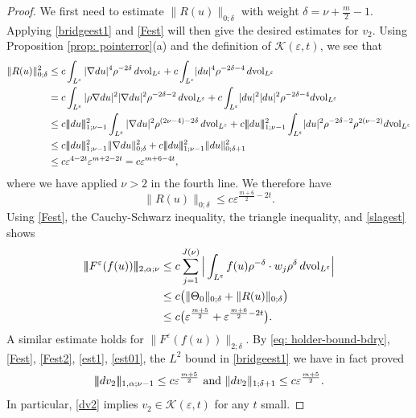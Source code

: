 \documentclass[11pt]{amsart}
\DeclarePairedDelimiter{\tnorm}{\vert\!\vert\!\vert}{\vert\!\vert\!\vert}
\theoremstyle{definition}
\theoremstyle{remark}
\newcommand{\vol}{\mathrm{vol}}
\begin{document}
\begin{proof}
    We first need to estimate $\|R(u)\|_{0;\delta}$ with weight $\delta = \nu + \frac{m}{2}-1$. Applying \eqref{bridgeest1} and \eqref{Fest} will then give the desired estimates for $v_2$. Using Proposition \ref{prop: pointerror}(a) and the definition of $\mathscr{K}(\varepsilon,t)$, we see that 
    \begin{align*}
        \|R(u)\|_{0;\delta}^2 &\leq c\int_{L^\varepsilon} |\nabla du|^4 \rho^{-2\delta} \, d\vol_{L^\varepsilon} +c\int_{L^\varepsilon}\lvert du\rvert^4\rho^{-2\delta-4 }\,d\vol_{L^\varepsilon}\\
        &= c\int_{L^\varepsilon} |\rho \nabla  du|^2 |\nabla  du|^2 \rho^{-2\delta - 2} \, d\vol_{L^\varepsilon} +c\int_{L^\varepsilon}\lvert du\rvert^2\lvert du\rvert^2\rho^{-2\delta-4}d\vol_{L^\varepsilon}\\
        &\leq c\tnorm{du}_{1;\nu-1}^2 \int_{L^\varepsilon} |\nabla  du|^2 \rho^{(2\nu - 4) - 2\delta} \, d\vol_{L^\varepsilon} +c\tnorm{du}_{1;\nu-1}^2\int_{L^\varepsilon}\lvert du\rvert^2\rho^{-2\delta-2}\rho^{2(\nu-2)}d\vol_{L^\varepsilon}\\
        &\leq c\tnorm{du}_{1;\nu-1}^2 \|\nabla du\|_{0;\delta}^2 +c\tnorm{du}_{1;\nu-1}^2 \| du\|_{0;\delta+1}^2\\
        &\leq c \varepsilon^{4  - 2t} \varepsilon^{m + 2 - 2t} = c \varepsilon^{m+6 - 4t},
    \end{align*}
    where we have applied $\nu > 2$ in the fourth line. We therefore have 
    \begin{equation}
        \|R(u)\|_{0;\delta} \leq c \varepsilon^{\frac{m+6}{2}- 2t}.\label{est1}   
    \end{equation}
    Using \eqref{Fest}, the Cauchy-Schwarz inequality, the triangle inequality, and \eqref{slagest} shows
    \begin{align}
        \tnorm{F^\varepsilon(f(u))}_{2, \alpha; \nu} &\leq c\sum_{j = 1}^{J(\nu)}\Big|\int_{L^\varepsilon} f(u)\rho^{-\delta} \cdot w_j \rho^{\delta} \, d\vol_{L^\varepsilon} \Big| \nonumber \\
        &\leq  c\big(\|\Theta_0\|_{0; \delta} + \|R(u)\|_{0;\delta}\big) \nonumber\\
        &\leq c\big(\varepsilon^{\frac{m+5}{2} } + \varepsilon^{\frac{m+6}{2}  - 2t} \big). \label{est01}
    \end{align}
    A similar estimate holds for $\|F^{\varepsilon}(f(u))\|_{2;\delta }$.
    By \ref{eq: holder-bound-bdry}, \eqref{Fest}, \eqref{Fest2}, \eqref{est1}, \eqref{est01},  the $L^2$ bound in \eqref{bridgeest1} we have in fact proved
    \begin{equation}
        \tnorm{dv_2}_{1, \alpha; \nu-1} \leq c \varepsilon^{\frac{m+5}{2}  } \text{ and } \lVert dv_2\rVert_{1; \delta+1} \leq c \varepsilon^{\frac{m+5}{2} }. \label{dv2}
    \end{equation}
    In particular, \eqref{dv2} implies $v_2 \in \mathscr{K}(\varepsilon,t)$ for any $t$ small.


\end{proof}
\end{document}
